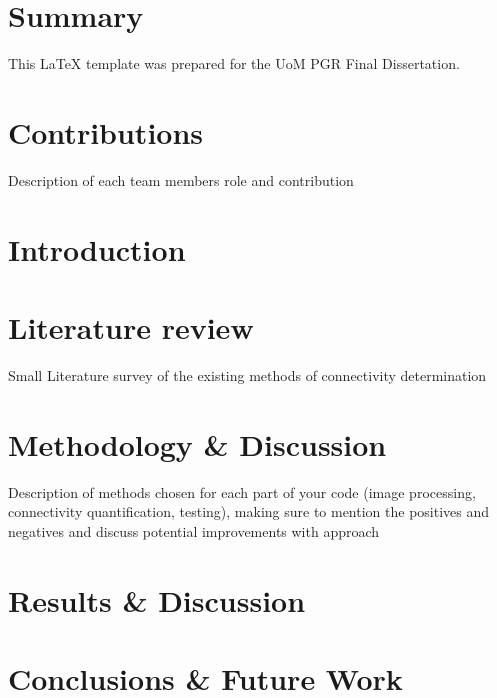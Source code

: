 \documentclass[12pt]{article}
\begin{document}
\section*{Summary}
     This LaTeX template was prepared for the UoM PGR Final Dissertation.
\newpage
\begin{singlespacing}
\tableofcontents
\end{singlespacing}
\setlength{\parskip}{1em}
\renewcommand{\baselinestretch}{2.0}

\newpage 
{}
\setcounter{page}{1}
\onehalfspacing

\section{Contributions}

Description of each team members role and contribution



\section{Introduction}

\cite{SUNIL2020152457}
\cite{SHARMA2018546}
\cite{SIMON2021152817}


\section{Literature review}

Small Literature survey of the existing methods of connectivity determination


\section{Methodology \& Discussion}

Description of methods chosen for each part of your code (image processing, connectivity quantification, testing), making sure to mention the positives and negatives and discuss potential improvements with approach

\section{Results \& Discussion}


\section{Conclusions \& Future Work}




\newpage
\singlespacing


\end{document}
